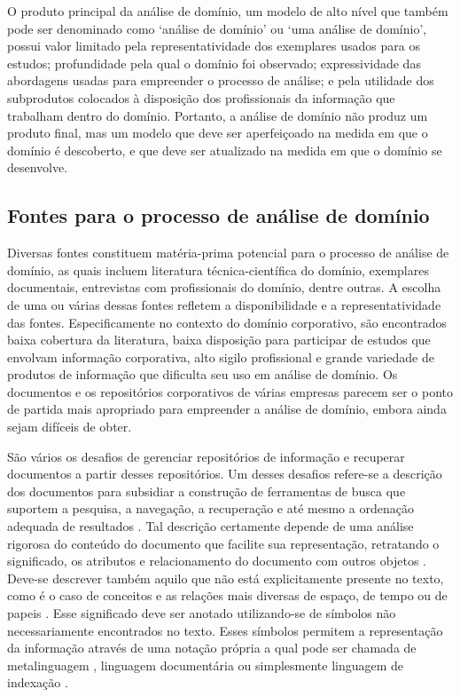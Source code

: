 O produto principal da análise de domínio, um modelo de alto nível que também pode ser denominado como `análise de domínio' ou `uma análise de domínio', possui valor limitado pela representatividade dos exemplares usados para os estudos; profundidade pela qual o domínio foi observado; expressividade das abordagens usadas para empreender o processo de análise; e pela utilidade dos subprodutos colocados à disposição dos profissionais da informação que trabalham dentro do domínio. Portanto, a análise de domínio não produz um produto final, mas um modelo que deve ser aperfeiçoado na medida em que o domínio é descoberto, e que deve ser atualizado na medida em que o domínio se desenvolve.

\subsection{Fontes para o processo de análise de domínio}

Diversas fontes constituem matéria-prima potencial para o processo de análise de domínio, as quais incluem literatura técnica-científica do domínio, exemplares documentais, entrevistas com profissionais do domínio, dentre outras. A escolha de uma ou várias dessas fontes refletem a disponibilidade e a representatividade das fontes. Especificamente no contexto do domínio corporativo, são encontrados baixa cobertura da literatura, baixa disposição para participar de estudos que envolvam informação corporativa, alto sigilo profissional e grande variedade de produtos de informação que dificulta seu uso em análise de domínio. Os documentos e os repositórios corporativos de várias empresas parecem ser o ponto de partida mais apropriado para empreender a análise de domínio, embora ainda sejam difíceis de obter.

São vários os desafios de gerenciar repositórios de informação e recuperar documentos a partir desses repositórios. Um desses desafios refere-se a descrição dos documentos para subsidiar a construção de ferramentas de busca que suportem a pesquisa, a navegação, a recuperação e até mesmo a ordenação adequada de resultados \cite{broughton2006}. Tal descrição certamente depende de uma análise rigorosa do conteúdo do documento que facilite sua representação, retratando o significado, os atributos e relacionamento do documento com outros objetos \cite{brascher2008organizacao}. Deve-se descrever também aquilo que não está explicitamente presente no texto, como é o caso de conceitos e as relações mais diversas de espaço, de tempo ou de papeis \cite{alvarenga12}. Esse significado deve ser anotado utilizando-se de símbolos não necessariamente encontrados no texto. Esses símbolos permitem a representação da informação através de uma notação própria a qual pode ser chamada de metalinguagem \cite{gardin1973}, linguagem documentária \cite{talamo2001} ou simplesmente linguagem de indexação \cite{fujita04}.

